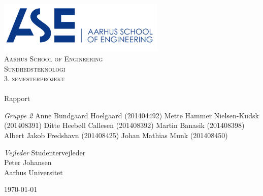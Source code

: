 \begin{titlingpage}
\begin{center}

~ \\[3cm]

\includegraphics[width=0.6\textwidth]{figurer/ASE}~\\[1cm]

\textsc{\LARGE Aarhus School of Engineering}\\[1.5cm]

\textsc{\Large Sundhedsteknologi}\\
\textsc{\Large 3. semesterprojekt}\\[0.5cm]

\noindent\makebox[\linewidth]{\rule{\textwidth}{0.4pt}}\\
[0.5cm]{\Huge Rapport}
\noindent\makebox[\linewidth]{\rule{\textwidth}{0.4pt}}

\end{center}

\textit{Gruppe 2} \newline
Anne Bundgaard Hoelgaard  (201404492) \newline
Mette Hammer Nielsen-Kudsk  (201408391) \newline
Ditte Heebøll Callesen (201408392) \newline	
Martin Banasik  (201408398) \newline	
Albert Jakob Fredshavn (201408425) \newline 
Johan Mathias Munk  (201408450) \newline 




\textit{Vejleder} \newline
Studentervejleder\\
Peter Johansen\\
Aarhus Universitet


\vfill

\begin{center}
{\large \today}
\end{center}


\end{titlingpage}